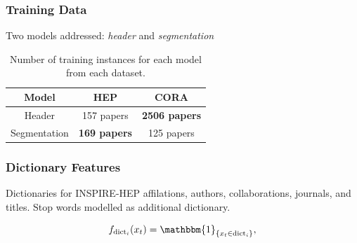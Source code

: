 \documentclass{beamer}
\begin{document}

\begin{frame}
\frametitle{Training Data}
Two models addressed: \emph{header} and \emph{segmentation}
\begin{table}[h]
\begin{center}
\begin{tabular}{|c|c|c|}
\hline
Model & HEP & CORA \\
\hline
Header & 157 papers & \textbf{2506 papers} \\
\hline
Segmentation & \textbf{169 papers} & 125 papers \\
\hline
\end{tabular}
\caption[Number of training instances for each model from each dataset.]{Number of training instances for each model from each dataset.}
\label{table:hepvscora}
\end{center}
\end{table}
\end{frame}


\begin{frame}
\frametitle{Dictionary Features}

Dictionaries for INSPIRE-HEP affilations, authors, collaborations, journals, and titles. Stop words modelled as additional dictionary.

$$
f_{\text{dict}_i}(x_t) = \mathbbm{1}_{\{x_t \in \text{dict}_i\}},
\label{eq:classfunctions}
$$

\end{frame}

\end{document}
